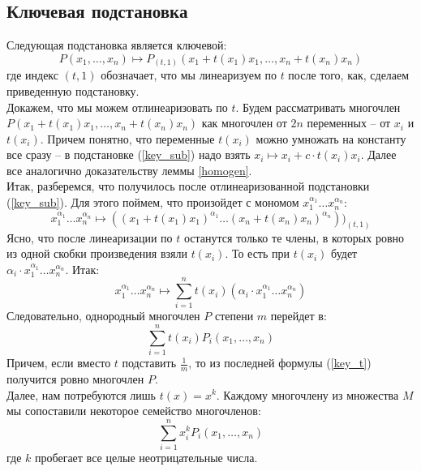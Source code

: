 \documentclass[12pt,a4paper]{article}
\begin{document}
    \subsection{Ключевая подстановка}
    Следующая подстановка является ключевой:
    \begin{equation}
        \label{key_sub}
        P(x_1,\ldots,x_n)\mapsto P_{(t, 1)}(x_1+t(x_1)x_1,\ldots,x_n+t(x_n)x_n)
    \end{equation}
    где индекс $(t,1)$ обозначает, что мы линеаризуем по $t$ после того, как, сделаем приведенную подстановку.\\
    Докажем, что мы можем отлинеаризовать по $t$. Будем рассматривать многочлен $P(x_1+t(x_1)x_1,\ldots,x_n+t(x_n)x_n)$ как многочлен от $2n$ переменных -- от $x_i$ и $t(x_i)$. Причем понятно, что переменные $t(x_i)$ можно умножать на константу все сразу -- в подстановке (\ref{key_sub}) надо взять $x_i\mapsto x_i+c\cdot t(x_i)x_i$. Далее все аналогично доказательству леммы \ref{homogen}.\\
    Итак, разберемся, что получилось после отлинеаризованной подстановки (\ref{key_sub}). Для этого поймем, что произойдет с мономом $x_1^{\alpha_1}\ldots x_n^{\alpha_n}$:
    $$x_1^{\alpha_1}\ldots x_n^{\alpha_n}\mapsto ((x_1+t(x_1)x_1)^{\alpha_1}\ldots (x_n+t(x_n)x_n)^{\alpha_n}))_{(t,1)}$$Ясно, что после линеаризации по $t$ останутся только те члены, в которых ровно из одной скобки произведения взяли $t(x_i)$. То есть при $t(x_i)$ будет $\alpha_i\cdot x_1^{\alpha_1}\ldots x_n^{\alpha_n}$. Итак:
    \begin{equation}
        \label{key_monom}
        x_1^{\alpha_1}\ldots x_n^{\alpha_n}\mapsto\sum\limits_{i=1}^n t(x_i)(\alpha_i\cdot x_1^{\alpha_1}\ldots x_n^{\alpha_n})
    \end{equation}
    Следовательно, однородный многочлен $P$ степени $m$ перейдет в:
    \begin{equation}
        \label{key_t}
        \sum\limits_{i=1}^n t(x_i)P_i(x_1,\ldots,x_n)
    \end{equation}
    Причем, если вместо $t$ подставить $\frac{1}{m}$, то из последней формулы (\ref{key_t}) получится ровно многочлен $P$.\\
    Далее, нам потребуются лишь $t(x)=x^k$.
    Каждому многочлену из множества $M$ мы сопоставили некоторое семейство многочленов:
    \begin{equation}
        \label{key_sum}
        \sum\limits_{i=1}^n x_i^k P_i(x_1,\ldots,x_n)
    \end{equation}
    где $k$ пробегает все целые неотрицательные числа.\\
\end{document}
